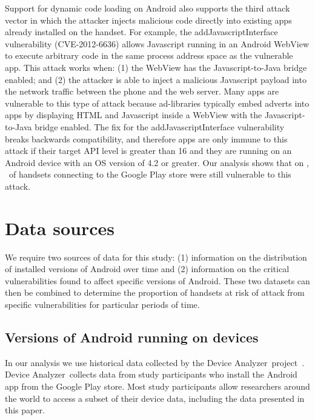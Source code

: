 \documentclass{llncs}
\newcommand{\da}{Device Analyzer}
\begin{document}
Support for dynamic code loading on Android also supports the third attack vector in which the attacker injects malicious code directly into existing apps already installed on the handset. 
For example, the addJavascriptInterface vulnerability (CVE-2012-6636) allows Javascript running in an Android WebView to execute arbitrary code in the same process address space as the vulnerable app.
This attack works when: (1) the WebView has the Javascript-to-Java bridge enabled; and (2) the attacker is able to inject a malicious Javascript payload into the network traffic between the phone and the web server. 
Many apps are vulnerable to this type of attack because ad-libraries typically embed adverts into apps by displaying HTML and Javascript inside a WebView with the Javascript-to-Java bridge enabled. 
The fix for the addJavascriptInterface vulnerability breaks backwards compatibility, and therefore apps are only immune to this attack if their target API level is greater than 16 and they are running on an Android device with an OS version of 4.2 or greater.
Our analysis shows that on \daGPAPISeventeenLaterDate, \daGPAPISeventeenEarlierProportion\ of handsets connecting to the Google Play store were still vulnerable to this attack.


\section{Data sources}
\label{sec:background}

We require two sources of data for this study: (1) information on the distribution of installed versions of Android over time and (2) information on the critical vulnerabilities found to affect specific versions of Android.
These two datasets can then be combined to determine the proportion of handsets at risk of attack from specific vulnerabilities for particular periods of time.

\subsection{Versions of Android running on devices}

In our analysis we use historical data collected by the \da\ project~\cite{Wagner2013}.
\da\ collects data from study participants who install the Android app from the Google Play store.
Most study participants allow researchers around the world to access a subset of their device data, including the data presented in this paper.
\end{document}
